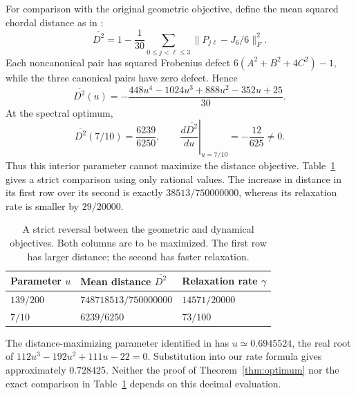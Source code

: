 \documentclass[11pt,a4paper]{article}
\theoremstyle{remark}
\begin{document}
For comparison with the original geometric objective, define the mean squared chordal distance as in \cite{rle}:
\begin{equation}\label{eq:distance}
 \overline{D^2}=1-\frac1{30}\sum_{0\le j<\ell\le3}
                             \|P_{j\ell}-J_6/6\|_F^2.
\end{equation}
Each noncanonical pair has squared Frobenius defect
$6(A^2+B^2+4C^2)-1$, while the three canonical pairs have zero defect. Hence
\begin{equation}\label{eq:distancepoly}
 \overline{D^2}(u)=
 -\frac{448u^4-1024u^3+888u^2-352u+25}{30}.
\end{equation}
At the spectral optimum,
\begin{equation}\label{eq:distanceatopt}
 \overline{D^2}(7/10)=\frac{6239}{6250},\qquad
 \left.\frac{d\overline{D^2}}{du}\right|_{u=7/10}=-\frac{12}{625}\ne0.
\end{equation}
Thus this interior parameter cannot maximize the distance objective. Table~\ref{tab:comparison} gives a strict comparison using only rational values. The increase in distance in its first row over its second is exactly $38513/750000000$, whereas its relaxation rate is smaller by $29/20000$.
\begin{table}[H]
\centering
\begin{tabular}{@{}lll@{}}
\toprule
Parameter $u$ & Mean distance $\overline{D^2}$ & Relaxation rate $\gamma$\\
\midrule
$139/200$ & $748718513/750000000$ & $14571/20000$\\
$7/10$ & $6239/6250$ & $73/100$\\
\bottomrule
\end{tabular}
\caption{A strict reversal between the geometric and dynamical objectives. Both columns are to be maximized. The first row has larger distance; the second has faster relaxation.}\label{tab:comparison}
\end{table}
The distance-maximizing parameter identified in \cite{rle} has $u\simeq0.6945524$, the real root of $112u^3-192u^2+111u-22=0$. Substitution into our rate formula gives approximately $0.728425$. Neither the proof of Theorem~\ref{thm:optimum} nor the exact comparison in Table~\ref{tab:comparison} depends on this decimal evaluation.
\end{document}
